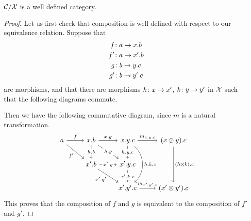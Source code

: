 \documentclass{article}
\begin{document}
\begin{proposition}
  ${\mathcal{C}}/\mathcal X$ is a well defined category.
\end{proposition}
\begin{proof}
  Let us first check that \Mellies composition is well defined with respect to our equivalence relation.  
  Suppose that
  \begin{gather*}
    f \colon a \to x.b \\
    f' \colon a \to x'.b \\
    g \colon b \to y.c \\
    g' \colon b \to y'.c
  \end{gather*}
  are \Mellies morphisms, and that there are morphisms $h \colon x \to x'$, $k \colon y \to y'$ in $\mathcal X$ such that the following diagrams commute.
  Then we have the following commutative diagram, since $m$ is a natural transformation.
  \[
    \begin{tikzcd}
      a \arrow[r, "f"] \arrow[dr, "f'"']
        & x.b \arrow[r, "x.g"] \arrow[dr, "h.g" description] \arrow[d, "h.b" description]
          & x.y.c \arrow[r, "{m_{x,y,c}}"] \arrow[d, "h.y.c" description] \arrow[dd, bend left=50, "h.k.c"]
            & (x \tensor y).c \arrow[dd, "(h\tensor k).c"] \\
        & x'.b \arrow[r, "x'.g" description] \arrow[dr, "x'.g'"']
          & x'.y.c \arrow[d, "x'.k.c" description]
            & \\
        &
          & x'.y'.c \arrow[r, "{m_{x',y',c}}"]
            & (x' \tensor y').c
    \end{tikzcd}
    \]
  This proves that the \Mellies composition of $f$ and $g$ is equivalent to the \Mellies composition of $f'$ and $g'$.


\end{proof}
\end{document}
